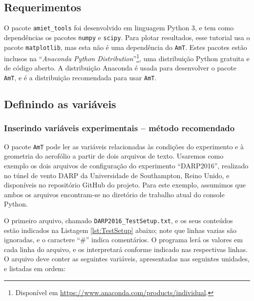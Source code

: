\documentclass[a4paper, 11pt, twoside]{article}
\newcommand{\AmT}{\texttt{AmT}}
\begin{document}
\subsection{Requerimentos}

O pacote \verb|amiet_tools| foi desenvolvido em linguagem Python 3, e tem como dependências os pacotes \verb|numpy| e \verb|scipy|. Para plotar resultados, esse tutorial usa o pacote \verb|matplotlib|, mas esta não é uma dependência do \AmT{}. Estes pacotes estão inclusos na ``\emph{Anaconda Python Distribution}''\footnote{Disponível em \url{https://www.anaconda.com/products/individual}.}, uma distribuição Python gratuita e de código aberto. A distribuição Anaconda é usada para desenvolver o pacote \AmT{}, e é a distribuição recomendada para usar \AmT{}.


\subsection{Definindo as variáveis}

\subsubsection{Inserindo variáveis experimentais -- método recomendado}

O pacote \AmT{} pode ler as variáveis relacionadas às condições do experimento e à geometria do aerofólio a partir de dois arquivos de texto. Usaremos como exemplo os dois arquivos de configuração do experimento ``DARP2016'', realizado no túnel de vento DARP da Universidade de Southampton, Reino Unido, e disponíveis no repositório GitHub do projeto. Para este exemplo, assumimos que ambos os arquivos encontram-se no diretório de trabalho atual do console Python.

O primeiro arquivo, chamado \verb|DARP2016_TestSetup.txt|, e os seus conteúdos estão indicados na Listagem \ref{lst:TestSetup} abaixo; note que linhas vazias são ignoradas, e o caractere ``\#'' indica comentários. O programa lerá os valores em cada linha do arquivo, e os interpretará conforme indicado nas respectivas linhas. O arquivo deve conter as seguintes variáveis, apresentadas nas seguintes unidades, e listadas em ordem:
\end{document}
